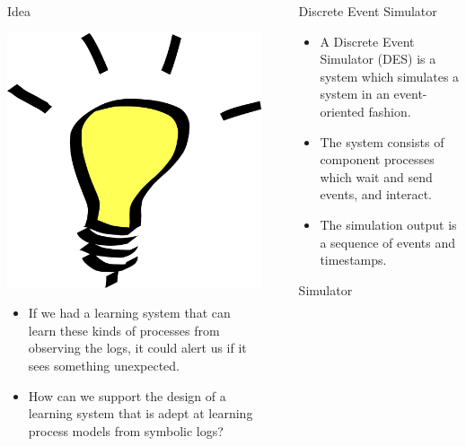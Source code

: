 \documentclass[final]{beamer}
\newlength{\sepwid}
\newlength{\onecolwid}
\begin{document}
\begin{frame}[t]
\begin{columns}[t]
\begin{column}{\onecolwid}
\begin{block}{Idea}
{\centering
\includegraphics[width=4 cm,keepaspectratio=true]{./bulb.png}\par
}

\begin{itemize}
\item If we had a learning system that can learn these kinds of processes from observing the logs, it could alert us if it sees something unexpected.
\item How can we support the design of a learning system that is adept at learning process models from symbolic logs?
\end{itemize}

\end{block}

\end{column}
\begin{column}{\sepwid}\end{column} %

\begin{column}{\onecolwid}

\begin{alertblock}{Discrete Event Simulator}

\begin{itemize}
 \item A Discrete Event Simulator (DES) is a system which simulates a system in an event-oriented fashion.
 \item The system consists of component processes which wait and send events, and interact.
 \item The simulation output is a sequence of events and timestamps.
\end{itemize}


\end{alertblock}

\begin{block}{Simulator}


\end{block}
\end{column}
\end{columns}
\end{frame}
\end{document}
